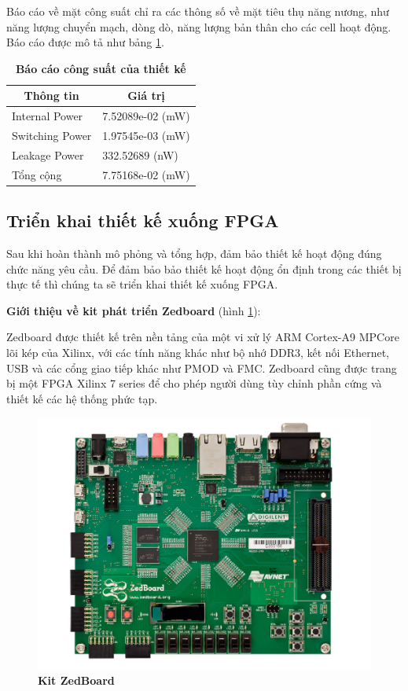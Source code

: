 Báo cáo về mặt công suất chỉ ra các thông số về mặt tiêu thụ năng nương, như năng 
lượng chuyển mạch, dòng dò, năng lượng bản thân cho các cell hoạt động. Báo cáo được mô tả như bảng \ref{syn_power}.
\begin{table}[H]
\centering
\caption[Báo cáo công suất của thiết kế]{\bfseries \fontsize{12pt}{0pt}\selectfont Báo cáo công suất của thiết kế}
\begin{tabular}{|l|l|}
\hline
\multicolumn{1}{|c|}{\textbf{Thông tin}} & \multicolumn{1}{c|}{\textbf{Giá trị}} \\ \hline
Internal Power & 7.52089e-02 (mW) \\ \hline
Switching Power & 1.97545e-03 (mW) \\ \hline
Leakage Power & 332.52689 (nW) \\ \hline
Tổng cộng & 7.75168e-02 (mW) \\ \hline
\end{tabular}
\label{syn_power}
\end{table}
\subsection{Triển khai thiết kế xuống FPGA}
Sau khi hoàn thành mô phỏng và tổng hợp, đảm bảo thiết kế hoạt động đúng chức 
năng yêu cầu. Để đảm bảo bảo thiết kế hoạt động ổn định trong các thiết bị thực tế thì chúng ta sẽ triển khai thiết kế xuống FPGA.

\textbf{Giới thiệu về kit phát triển Zedboard} (hình \ref{zedboard}):

Zedboard được thiết kế trên nền tảng của một vi xử lý ARM Cortex-A9 MPCore lõi kép của Xilinx, với các tính năng khác như bộ nhớ DDR3, kết nối Ethernet, USB và các cổng giao tiếp khác như PMOD và FMC. Zedboard cũng được trang bị một FPGA Xilinx 7 series để cho phép người dùng tùy chỉnh phần cứng và thiết kế các hệ thống phức tạp.

\begin{figure}[H]
    \centering
    \includegraphics[width=12cm]{Images/Chuong5/fpga/zedboard.jpg}
    \caption[Kit ZedBoard]{\bfseries \fontsize{12pt}{0pt}\selectfont Kit ZedBoard}
    \label{zedboard}
\end{figure}

